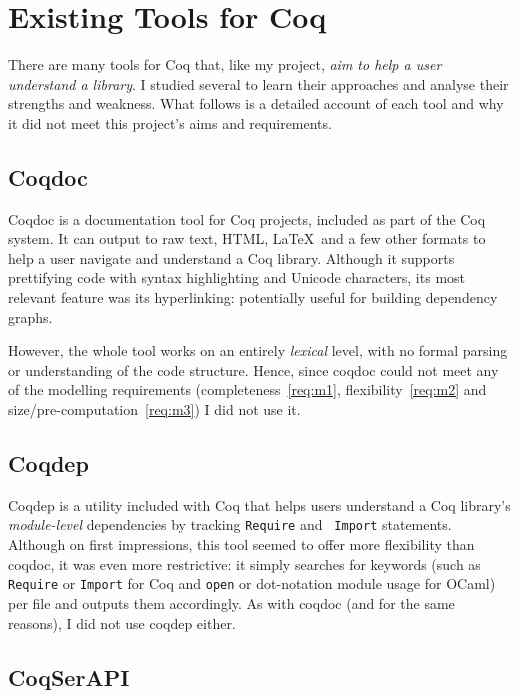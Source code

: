 \section{Existing Tools for Coq}\label{prep:coqtools}

There are many tools for Coq that, like my project, \emph{aim to help a user
understand a library}. I studied several to learn their approaches and analyse
their strengths and weakness. What follows is a detailed account of each tool
and why it did not meet this project's aims and requirements.

\subsection{Coqdoc}

Coqdoc is a documentation tool for Coq projects, included as part of the Coq
system. It can output to raw text, HTML, \LaTeX~and a few other formats to help
a user navigate and understand a Coq library.  Although it supports prettifying
code with syntax highlighting and Unicode characters, its most relevant feature
was its hyperlinking: potentially useful for building dependency graphs.

However, the whole tool works on an entirely \emph{lexical} level, with no
formal parsing or understanding of the code structure. Hence, since coqdoc could
not meet any of the modelling requirements (completeness~\ref{req:m1},
flexibility~\ref{req:m2} and size/pre-computation~\ref{req:m3}) I did not use
it.

\subsection{Coqdep}

Coqdep is a utility included with Coq that helps users understand a Coq
library's \emph{module-level} dependencies by tracking {\tt Require} and {\tt
Import} statements.  Although on first impressions, this tool seemed to offer
more flexibility than coqdoc, it was even more restrictive: it simply searches
for keywords (such as \texttt{Require} or \texttt{Import} for Coq  and
\texttt{open} or dot-notation module usage for OCaml) per file and outputs them
accordingly. As with coqdoc (and for the same reasons), I did not use coqdep
either.

\subsection{CoqSerAPI}

